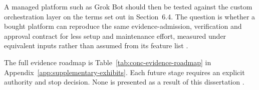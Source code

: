 A managed platform such as Grok Bot should then be tested against the custom orchestration layer on
the terms set out in Section~6.4. The question is whether a bought platform can reproduce the same
evidence-admission, verification and approval contract for less setup and maintenance effort, measured
under equivalent inputs rather than assumed from its feature list
\citep{spacexai2026grokbot,guo2024multiagent,pineau2021reproducibility}.

The full evidence roadmap is Table~\ref{tab:conc-evidence-roadmap} in
Appendix~\ref{app:supplementary-exhibits}. Each future stage
requires an explicit authority and stop decision. None is presented as a result of this dissertation
\citep{nist2023airmf,pineau2021reproducibility}.
